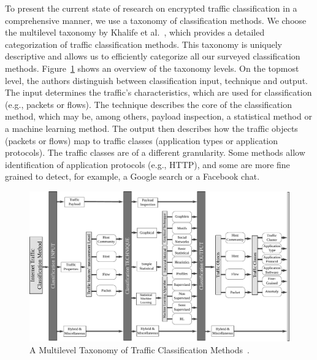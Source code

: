 To present the current state of research on encrypted traffic classification in a comprehensive manner, we use a taxonomy of classification methods. We choose the multilevel taxonomy by Khalife et al.~\cite{Khalife-2014-multilevel}, which provides a detailed categorization of traffic classification methods. This taxonomy is uniquely descriptive and allows us to efficiently categorize all our surveyed classification methods. Figure~\ref{fig:taxonomy} shows an overview of the taxonomy levels. On the topmost level, the authors distinguish between classification input, technique and output. The input determines the traffic's characteristics, which are used for classification (e.g., packets or flows). The technique describes the core of the classification method, which may be, among others, payload inspection, a statistical method or a machine learning method. The output then describes how the traffic objects (packets or flows) map to traffic classes (application types or application protocols). The traffic classes are of a different granularity. Some methods allow identification of application protocols (e.g., HTTP), and some are more fine grained to detect, for example, a Google search or a Facebook chat.

\begin{figure}[!ht]
	\begin{center}
		\includegraphics[width=\textwidth]{figures/paper-encrypted/taxonomy}
		\caption{A Multilevel Taxonomy of Traffic Classification Methods~\cite{Khalife-2014-multilevel}.} 
		\label{fig:taxonomy}
	\end{center}
\end{figure}


